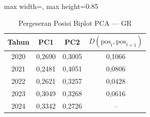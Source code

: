 \begin{table}[H]
\centering
\caption{Pergeseran Posisi Biplot PCA --- GR} \label{tab:appjarak_pca_loading_gr}
\begin{adjustbox}{max width=\textwidth, max height=0.85\textheight}
\begin{tabular}{|c|c|c|c|}
\hline
\textbf{Tahun} & \textbf{PC1} & \textbf{PC2} & \textbf{$D(\text{pos}_t, \text{pos}_{t+1})$} \\
\hline
2020 & 0,2690 & 0,3005 & 0,1066 \\
2021 & 0,2481 & 0,4051 & 0,0806 \\
2022 & 0,2621 & 0,3257 & 0,0428 \\
2023 & 0,3049 & 0,3268 & 0,0616 \\
2024 & 0,3342 & 0,2726 & -- \\
\hline
\end{tabular}
\end{adjustbox}
\end{table}